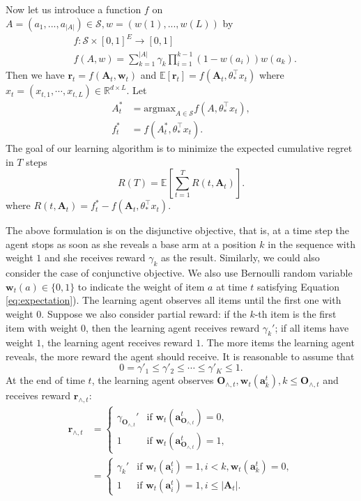 \documentclass{article}
\newcommand{\EE}{\mathbb{E}}
\newcommand{\RR}{\mathbb{R}}
\newcommand{\bA}{\mathbf{A}}
\newcommand{\ba}{\mathbf{a}}
\newcommand{\bO}{\mathbf{O}}
\newcommand{\br}{\mathbf{r}}
\newcommand{\bw}{\mathbf{w}}
\newcommand{\cS}{\mathcal{S}}
\newcommand{\argmax}{\mathrm{argmax}}
\newcommand{\abs}[1]{\left| #1 \right|}
\begin{document}
Now let us introduce a function $f$ on $A = (a_1,...,a_{\abs{A}}) \in \cS, w = (w(1),...,w(L))$ by
\begin{align}
&f : \cS \times [0,1]^E \to [0,1] \nonumber \\
&f(A,w) = \sum_{k = 1}^{\abs{A}} \gamma_{k} \prod_{i=1}^{k-1} (1 - w(a_i)) w(a_k).
	\label{eq:functionf}
\end{align}
Then we have $\br_t = f(\bA_t, \bw_t)$ and $\EE[\br_t] = f(\bA_t, \theta_{\ast}^{\top}x_t)$ where $x_t = (x_{t,1}, \cdots, x_{t,L}) \in \RR^{d \times L}$. Let 
\begin{align*}
A_t^{\ast} &= \argmax_{A\in \cS} f(A,\theta_{\ast}^{\top}x_t),\\
f_t^{\ast} &= f(A_t^{\ast}, \theta_{\ast}^{\top}x_t).
\end{align*}
The goal of our learning algorithm is to minimize the expected cumulative regret in $T$ steps
$$
R(T) = \EE[\sum_{t=1}^T R(t, \bA_t)].
$$
where $R(t, \bA_t) = f_t^{\ast} - f(\bA_t, \theta_{\ast}^{\top}x_t)$.

The above formulation is on the disjunctive objective, that is, at a time step the agent stops as soon as she reveals a base arm at a position $k$ in the sequence with weight $1$ and she receives reward $\gamma_k$ as the result. Similarly, we could also consider the case of conjunctive objective. We also use Bernoulli random variable $\bw_{t}(a) \in \{0,1\}$ to indicate the weight of item $a$ at time $t$ satisfying Equation \eqref{eq:expectation}). The learning agent observes all items until the first one with weight $0$. Suppose we also consider partial reward: if the $k$-th item is the first item with weight $0$, then the learning agent receives reward $\gamma_k'$; if all items have weight $1$, the learning agent receives reward $1$. The more items the learning agent reveals, the more reward the agent should receive. It is reasonable to assume that
$$
0 = \gamma'_1 \leq \gamma'_2 \leq \cdots \leq \gamma'_K \leq 1.
$$
At the end of time $t$, the learning agent observes $\bO_{\wedge, t}, \bw_t(\ba_k^t), k \leq \bO_{\wedge, t}$ and receives reward
	$\br_{\wedge, t}$:
\begin{align*}
\br_{\wedge, t} &= \begin{cases}
\gamma_{\bO_{\wedge, t}}'  &\text{if } \bw_t(\ba_{\bO_{\wedge, t}}^t) = 0,\\
1 &\text{if } \bw_t(\ba_{\bO_{\wedge, t}}^t) = 1,
\end{cases}\\
&=\begin{cases}
\gamma_{k}'  &\text{if } \bw_t(\ba_{i}^t) = 1, i < k, \bw_t(\ba_{k}^t) = 0,\\
1 &\text{if } \bw_t(\ba_{i}^t) = 1, i\leq \abs{\bA_t}.
\end{cases}
\end{align*}
\end{document}
